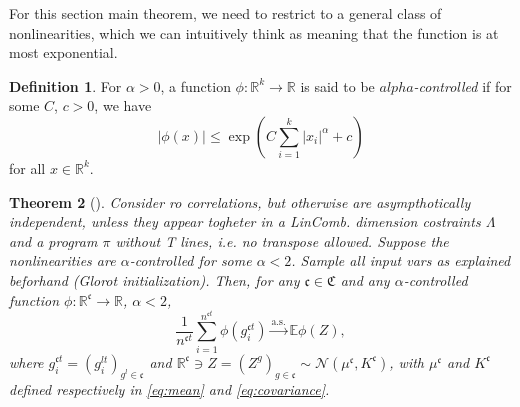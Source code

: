 \documentclass[11pt,notitlepage]{article}
\numberwithin{equation}{section}
\def\R{{\mathbb{R}}}
\def\normdist{\mathcal{N}}
\def\asconv{\stackrel{\text{a.s.}}{\longrightarrow}}
\newtheorem{theorem}{Theorem}[section]
\theoremstyle{remark}
\theoremstyle{definition}
\newtheorem{definition_body}[theorem]{Definition}
\newcommand{\definition}[1]{
	\theoremstyle{definition}
	\begin{definition_body}
		#1
	\end{definition_body}
	\theoremstyle{plain}
}
\begin{document}
	For this section main theorem, we need to restrict to a general class of nonlinearities, which we can intuitively think as meaning that the function is at most exponential.
	
	\definition{
		For $\alpha > 0$, a function $\phi : \R^k \rightarrow \R$ is said to be \emph{$alpha$-controlled} if for some $C$, $c > 0$, we have
		\begin{equation}
		|\phi(x)| \leq \exp\left(C \sum_{i=1}^k|x_i|^\alpha + c \right)
		\end{equation}
		for all $x \in \R^k$.
	}
	
	\begin{theorem}[\cite{yang2019tensor}]\label{thm:yangMaster}
		Consider ro correlations, but otherwise are asympthotically independent, unless they appear togheter in a LinComb.
		dimension costraints $\Lambda$ and a program $\pi$ without T lines, i.e. no transpose allowed. Suppose the nonlinearities are $\alpha$-controlled for some $\alpha <2$. Sample all input vars as explained beforhand (Glorot initialization). Then, for any $\mathfrak{c} \in \mathfrak{C}$ and any $\alpha$-controlled function $\phi : \R^{\mathfrak{c}} \rightarrow \R$, $\alpha < 2$,
		\begin{equation}
		\frac{1}{n^{\mathfrak{c}t}}\sum_{i=1}^{n^{\mathfrak{c}t}} \phi (g_i^{\mathfrak{c}t}) 
		\asconv \mathbb{E}\phi(Z),
		\end{equation}
		where $g^{\mathfrak{c}t}_i = (g^{lt}_i)_{g^l \in \mathfrak{c}}$ and $\R^{\mathfrak{c}} \ni Z = (Z^g)_{g \in \mathfrak{c}} \sim \normdist(\mu^{\mathfrak{c}}, K^{\mathfrak{c}})$, with $\mu^{\mathfrak{c}}$ and $K^{\mathfrak{c}}$ defined respectively in \eqref{eq:mean} and \eqref{eq:covariance}.
	\end{theorem}
	
\end{document}
